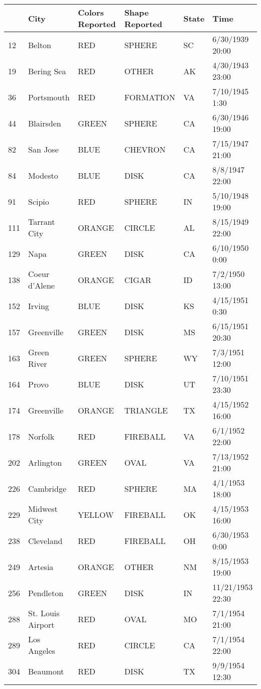 \begin{tabular}{llllll}
\toprule
 & City & Colors Reported & Shape Reported & State & Time \\
\midrule
12 & Belton & RED & SPHERE & SC & 6/30/1939 20:00 \\
19 & Bering Sea & RED & OTHER & AK & 4/30/1943 23:00 \\
36 & Portsmouth & RED & FORMATION & VA & 7/10/1945 1:30 \\
44 & Blairsden & GREEN & SPHERE & CA & 6/30/1946 19:00 \\
82 & San Jose & BLUE & CHEVRON & CA & 7/15/1947 21:00 \\
84 & Modesto & BLUE & DISK & CA & 8/8/1947 22:00 \\
91 & Scipio & RED & SPHERE & IN & 5/10/1948 19:00 \\
111 & Tarrant City & ORANGE & CIRCLE & AL & 8/15/1949 22:00 \\
129 & Napa & GREEN & DISK & CA & 6/10/1950 0:00 \\
138 & Coeur d'Alene & ORANGE & CIGAR & ID & 7/2/1950 13:00 \\
152 & Irving & BLUE & DISK & KS & 4/15/1951 0:30 \\
157 & Greenville & GREEN & DISK & MS & 6/15/1951 20:30 \\
163 & Green River & GREEN & SPHERE & WY & 7/3/1951 12:00 \\
164 & Provo & BLUE & DISK & UT & 7/10/1951 23:30 \\
174 & Greenville & ORANGE & TRIANGLE & TX & 4/15/1952 16:00 \\
178 & Norfolk & RED & FIREBALL & VA & 6/1/1952 22:00 \\
202 & Arlington & GREEN & OVAL & VA & 7/13/1952 21:00 \\
226 & Cambridge & RED & SPHERE & MA & 4/1/1953 18:00 \\
229 & Midwest City & YELLOW & FIREBALL & OK & 4/15/1953 16:00 \\
238 & Cleveland & RED & FIREBALL & OH & 6/30/1953 0:00 \\
249 & Artesia & ORANGE & OTHER & NM & 8/15/1953 19:00 \\
256 & Pendleton & GREEN & DISK & IN & 11/21/1953 22:30 \\
288 & St. Louis Airport & RED & OVAL & MO & 7/1/1954 21:00 \\
289 & Los Angeles & RED & CIRCLE & CA & 7/1/1954 22:00 \\
304 & Beaumont & RED & DISK & TX & 9/9/1954 12:30 \\

\end{tabular}
